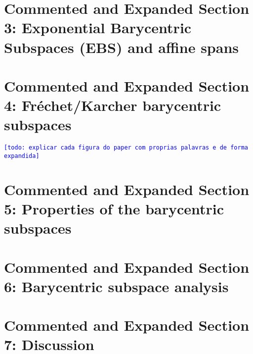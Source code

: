 \documentclass[a4paper,titlepage]{article}
\newcommand{\indraftnote}[1]{\textcolor{blue}{\texttt{\footnotesize [#1]}}}
\newcommand{\todo}[1]{\indraftnote{todo: #1}} %
\begin{document}
\section{Commented and Expanded Section 3: Exponential Barycentric Subspaces
(EBS) and affine spans}

\section{Commented and Expanded Section 4: Fréchet/Karcher barycentric subspaces}

{
\vspace{1em}
\vspace{1em}
}

\todo{explicar cada figura do paper com proprias palavras e de forma expandida}

\section{Commented and Expanded Section 5: Properties of the barycentric
subspaces}

\section{Commented and Expanded Section 6: Barycentric subspace analysis}

\section{Commented and Expanded Section 7: Discussion}
\end{document}
